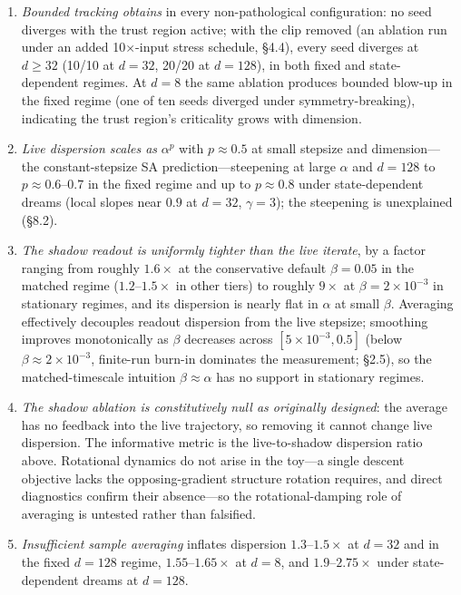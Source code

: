 \documentclass[11pt]{article}
\begin{document}
\begin{enumerate}[nosep]
    \item \emph{Bounded tracking obtains} in every non-pathological configuration: no seed diverges with the trust region active; with the clip removed (an ablation run under an added 10$\times$-input stress schedule, \S 4.4), every seed diverges at $d \geq 32$ (10/10 at $d = 32$, 20/20 at $d = 128$), in both fixed and state-dependent regimes. At $d = 8$ the same ablation produces bounded blow-up in the fixed regime (one of ten seeds diverged under symmetry-breaking), indicating the trust region's criticality grows with dimension.
    \item \emph{Live dispersion scales as} $\alpha^p$ with $p \approx 0.5$ at small stepsize and dimension---the constant-stepsize SA prediction---steepening at large $\alpha$ and $d = 128$ to $p \approx 0.6$--$0.7$ in the fixed regime and up to $p \approx 0.8$ under state-dependent dreams (local slopes near $0.9$ at $d = 32$, $\gamma = 3$); the steepening is unexplained (\S 8.2).
    \item \emph{The shadow readout is uniformly tighter than the live iterate}, by a factor ranging from roughly $1.6\times$ at the conservative default $\beta = 0.05$ in the matched regime ($1.2$--$1.5\times$ in other tiers) to roughly $9\times$ at $\beta = 2 \times 10^{-3}$ in stationary regimes, and its dispersion is nearly flat in $\alpha$ at small $\beta$. Averaging effectively decouples readout dispersion from the live stepsize; smoothing improves monotonically as $\beta$ decreases across $[5 \times 10^{-3}, 0.5]$ (below $\beta \approx 2 \times 10^{-3}$, finite-run burn-in dominates the measurement; \S 2.5), so the matched-timescale intuition $\beta \approx \alpha$ has no support in stationary regimes.
    \item \emph{The shadow ablation is constitutively null as originally designed}: the average has no feedback into the live trajectory, so removing it cannot change live dispersion. The informative metric is the live-to-shadow dispersion ratio above. Rotational dynamics do not arise in the toy---a single descent objective lacks the opposing-gradient structure rotation requires, and direct diagnostics confirm their absence---so the rotational-damping role of averaging is untested rather than falsified.
    \item \emph{Insufficient sample averaging} inflates dispersion $1.3$--$1.5\times$ at $d = 32$ and in the fixed $d = 128$ regime, $1.55$--$1.65\times$ at $d = 8$, and $1.9$--$2.75\times$ under state-dependent dreams at $d = 128$.

\end{enumerate}
\end{document}
